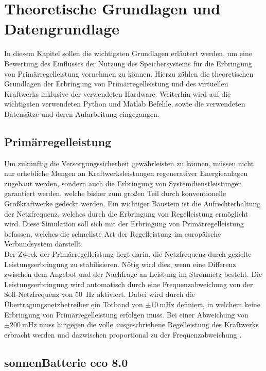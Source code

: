 
\section{Theoretische Grundlagen und Datengrundlage}

In diesem Kapitel sollen die wichtigsten Grundlagen erläutert werden, um eine Bewertung des Einflusses der Nutzung des Speichersystems für die Erbringung von Primärregelleistung vornehmen zu können. Hierzu zählen die theoretischen Grundlagen der Erbringung von Primärregelleistung und des virtuellen Kraftwerks inklusive der verwendeten Hardware. Weiterhin wird auf die wichtigsten verwendeten Python und Matlab Befehle, sowie die verwendeten Datensätze und deren Aufarbeitung eingegangen.

\subsection{Primärregelleistung}

Um zukünftig die Versorgungssicherheit gewährleisten zu können, müssen nicht nur erhebliche Mengen an Kraftwerksleistungen regenerativer Energieanlagen zugebaut werden, sondern auch die Erbringung von Systemdienstleistungen garantiert werden, welche bisher zum großen Teil durch konventionelle Großkraftwerke gedeckt werden. Ein wichtiger Baustein ist die Aufrechterhaltung der Netzfrequenz, welches durch die Erbringung von Regelleistung ermöglicht wird. Diese Simulation soll sich mit der Erbringung von Primärregelleistung befassen, welches die schnellste Art der Regelleistung im europäische Verbundsystem darstellt.\medskip\\
Der Zweck der Primärregelleistung liegt darin, die Netzfrequenz durch gezielte Leistungserbringung zu stabilisieren. Nötig wird dies, wenn eine Differenz zwischen dem Angebot und der Nachfrage an Leistung im Stromnetz besteht. Die Leistungserbringung wird automatisch durch eine Frequenzabweichung von der Soll-Netzfrequenz von \SI{50}{\hertz} aktiviert. Dabei wird durch die Übertragungsnetzbetreiber ein Totband von $\pm \SI{10}{\milli\hertz}$ definiert, in welchem keine Erbringung von Primärregelleistung erfolgen muss. Bei einer Abweichung von $\pm \SI{200}{\milli\hertz}$ muss hingegen die volle ausgeschriebene Regelleistung des Kraftwerks erbracht werden und dazwischen proportional zu der Frequenzabweichung \parencite{nextKW20}.


\subsection{sonnenBatterie eco 8.0}\label{sec:SB_eco8_Theorie}

